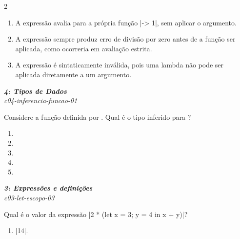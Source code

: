 \documentclass[a4paper,10pt,brazil]{article}
\begin{document}
\begin{multicols}{2}
\begin{enumerate}
  \item A expressão avalia para a própria função \haskellinline|\x -> 1|, sem aplicar o argumento.

  \item A expressão sempre produz erro de divisão por zero antes de a função ser aplicada, como ocorreria em avaliação estrita.

  \item A expressão é sintaticamente inválida, pois uma lambda não pode ser aplicada diretamente a um argumento.


\end{enumerate}

\begin{flushright}
  \footnotesize
  \textit{\textbf{4: Tipos de Dados}}\\
  \textit{c04-inferencia-funcao-01}\\

\end{flushright}
Considere a função definida por . Qual é o tipo inferido para ?

\begin{enumerate}
  \item {}

  \item {}

  \item {}

  \item {}

  \item {}


\end{enumerate}

\begin{flushright}
  \footnotesize
  \textit{\textbf{3: Expressões e definições}}\\
  \textit{c03-let-escopo-03}\\

\end{flushright}
Qual é o valor da expressão \haskellinline|2 * (let x = 3; y = 4 in x + y)|?

\begin{enumerate}
  \item \haskellinline|14|.


\end{enumerate}
\end{multicols}
\end{document}
